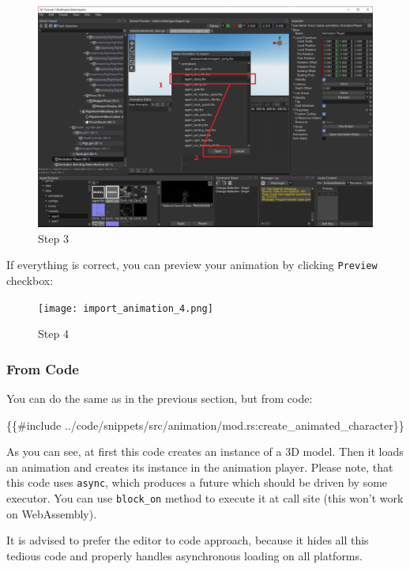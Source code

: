 \documentclass[
]{book}
\newenvironment{Shaded}{\begin{snugshade}}{\end{snugshade}}
\newcommand{\NormalTok}[1]{#1}
\theoremstyle{definition}
\theoremstyle{definition}
\theoremstyle{definition}
\theoremstyle{definition}
\theoremstyle{remark}
\begin{document}
\begin{figure}
\centering
\includegraphics{images/animation/import_animation_3.png}
\caption{Step 3}
\end{figure}

If everything is correct, you can preview your animation by clicking \texttt{Preview} checkbox:

\begin{figure}
\centering
\texttt{[image: import\_animation\_4.png]}
\caption{Step 4}
\end{figure}

\subsubsection{From Code}\label{from-code-1}

You can do the same as in the previous section, but from code:

\begin{Shaded}
\begin{Highlighting}[]
\NormalTok{\{\{\#include ../code/snippets/src/animation/mod.rs:create\_animated\_character\}\}}
\end{Highlighting}
\end{Shaded}

As you can see, at first this code creates an instance of a 3D model. Then it loads an animation and creates its instance in the animation player. Please note, that this code uses \texttt{async}, which produces a future which should be driven by some executor. You can use \texttt{block\_on} method to execute it at call site (this won't work on WebAssembly).

It is advised to prefer the editor to code approach, because it hides all this tedious code and properly handles asynchronous loading on all platforms.
\end{document}
